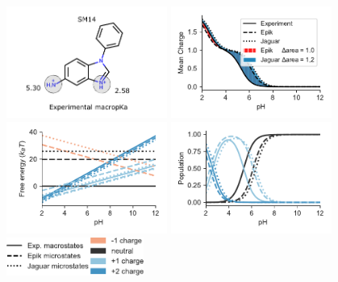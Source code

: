 \documentclass[9pt,lineno,final]{elife}
\begin{document}
\begin{figure}[H]
	\centering
	
	\includegraphics[width=0.47\textwidth]{Images/Molecules/SM14-pka.pdf} \hfill
	\includegraphics[width=0.47\textwidth]{fig1_charge_SM14.pdf} \\
    \includegraphics[width=0.47\textwidth]{fig1_free_energy_SM14.pdf} \hfill
	\includegraphics[width=0.47\textwidth]{fig1_population_SM14.pdf}\\
	\includegraphics[width=0.4\textwidth]{fig1_legend.pdf}
	

\end{figure}
\end{document}
